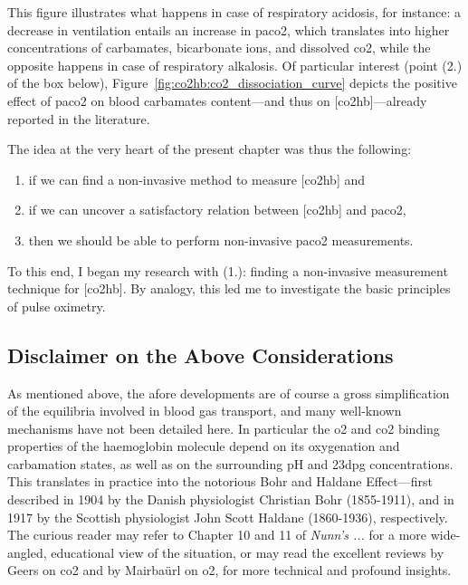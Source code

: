 This figure illustrates what happens in case of respiratory acidosis, for instance: a decrease in ventilation entails an increase in \gls{paco2}, which translates into higher concentrations of carbamates, bicarbonate ions, and dissolved \gls{co2}, while the opposite happens in case of respiratory alkalosis. Of particular interest (point (2.) of the box below), Figure~\ref{fig:co2hb:co2_dissociation_curve} depicts the positive effect of \gls{paco2} on blood carbamates content---and thus on [\gls{co2hb}]---already reported in the literature\cite{bauer1972, perrella1975a, gros1976}.
\begin{keypointbox}
	The idea at the very heart of the present chapter was thus the following:
	\begin{enumerate}
		\item if we can find a non-invasive method to measure [\gls{co2hb}] and
		\item if we can uncover a satisfactory relation between [\gls{co2hb}] and \gls{paco2},
		\item then we should be able to perform non-invasive \gls{paco2} measurements.
	\end{enumerate}
	To this end, I began my research with (1.): finding a non-invasive measurement technique for [\gls{co2hb}]. By analogy, this led me to investigate the basic principles of pulse oximetry.
\end{keypointbox}

\subsection{Disclaimer on the Above Considerations}\label{sect:co2hb:abg_disclaimer}

As mentioned above, the afore developments are of course a gross simplification of the equilibria involved in blood gas transport, and many well-known mechanisms have not been detailed here. In particular the \gls{o2} and \gls{co2} binding properties of the haemoglobin molecule depend on its oxygenation and carbamation states, as well as on the surrounding pH and \gls{23dpg} concentrations. This translates in practice into the notorious Bohr and Haldane Effect---first described in 1904 by the Danish physiologist Christian Bohr (1855-1911)\cite{bohr1904}, and in 1917 by the Scottish physiologist John Scott Haldane (1860-1936)\cite{haldane1914}, respectively. The curious reader may refer to Chapter 10 and 11 of \textit{Nunn's ...}\cite{nunns} for a more wide-angled, educational view of the situation, or may read the excellent reviews by Geers \etal{} on \gls{co2}\cite{geers2000} and by Mairbaürl \etal{} on \gls{o2}\cite{mairbaurl2012}, for more technical and profound insights.

